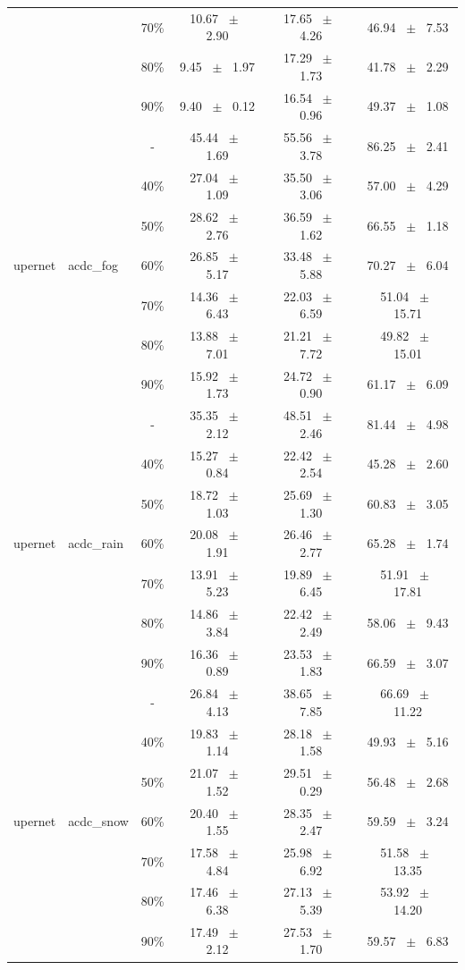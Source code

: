 \begin{table}[h]
\begin{tabular}{@{}l l c c c c@{}}
    & & 70\% & 10.67 ~$\pm$~ 2.90 & 17.65 ~$\pm$~ 4.26 & 46.94 ~$\pm$~ 7.53 \\
    & & 80\% & 9.45 ~$\pm$~ 1.97 & 17.29 ~$\pm$~ 1.73 & 41.78 ~$\pm$~ 2.29 \\
    & & 90\% & 9.40 ~$\pm$~ 0.12 & 16.54 ~$\pm$~ 0.96 & 49.37 ~$\pm$~ 1.08 \\
    \midrule
    \multirow{7}{*}{upernet} & \multirow{7}{*}{acdc_fog} & - & 45.44 ~$\pm$~ 1.69 & 55.56 ~$\pm$~ 3.78 & 86.25 ~$\pm$~ 2.41 \\
    & & 40\% & 27.04 ~$\pm$~ 1.09 & 35.50 ~$\pm$~ 3.06 & 57.00 ~$\pm$~ 4.29 \\
    & & 50\% & 28.62 ~$\pm$~ 2.76 & 36.59 ~$\pm$~ 1.62 & 66.55 ~$\pm$~ 1.18 \\
    & & 60\% & 26.85 ~$\pm$~ 5.17 & 33.48 ~$\pm$~ 5.88 & 70.27 ~$\pm$~ 6.04 \\
    & & 70\% & 14.36 ~$\pm$~ 6.43 & 22.03 ~$\pm$~ 6.59 & 51.04 ~$\pm$~ 15.71 \\
    & & 80\% & 13.88 ~$\pm$~ 7.01 & 21.21 ~$\pm$~ 7.72 & 49.82 ~$\pm$~ 15.01 \\
    & & 90\% & 15.92 ~$\pm$~ 1.73 & 24.72 ~$\pm$~ 0.90 & 61.17 ~$\pm$~ 6.09 \\
    \midrule
    \multirow{7}{*}{upernet} & \multirow{7}{*}{acdc_rain} & - & 35.35 ~$\pm$~ 2.12 & 48.51 ~$\pm$~ 2.46 & 81.44 ~$\pm$~ 4.98 \\
    & & 40\% & 15.27 ~$\pm$~ 0.84 & 22.42 ~$\pm$~ 2.54 & 45.28 ~$\pm$~ 2.60 \\
    & & 50\% & 18.72 ~$\pm$~ 1.03 & 25.69 ~$\pm$~ 1.30 & 60.83 ~$\pm$~ 3.05 \\
    & & 60\% & 20.08 ~$\pm$~ 1.91 & 26.46 ~$\pm$~ 2.77 & 65.28 ~$\pm$~ 1.74 \\
    & & 70\% & 13.91 ~$\pm$~ 5.23 & 19.89 ~$\pm$~ 6.45 & 51.91 ~$\pm$~ 17.81 \\
    & & 80\% & 14.86 ~$\pm$~ 3.84 & 22.42 ~$\pm$~ 2.49 & 58.06 ~$\pm$~ 9.43 \\
    & & 90\% & 16.36 ~$\pm$~ 0.89 & 23.53 ~$\pm$~ 1.83 & 66.59 ~$\pm$~ 3.07 \\
    \midrule
    \multirow{7}{*}{upernet} & \multirow{7}{*}{acdc_snow} & - & 26.84 ~$\pm$~ 4.13 & 38.65 ~$\pm$~ 7.85 & 66.69 ~$\pm$~ 11.22 \\
    & & 40\% & 19.83 ~$\pm$~ 1.14 & 28.18 ~$\pm$~ 1.58 & 49.93 ~$\pm$~ 5.16 \\
    & & 50\% & 21.07 ~$\pm$~ 1.52 & 29.51 ~$\pm$~ 0.29 & 56.48 ~$\pm$~ 2.68 \\
    & & 60\% & 20.40 ~$\pm$~ 1.55 & 28.35 ~$\pm$~ 2.47 & 59.59 ~$\pm$~ 3.24 \\
    & & 70\% & 17.58 ~$\pm$~ 4.84 & 25.98 ~$\pm$~ 6.92 & 51.58 ~$\pm$~ 13.35 \\
    & & 80\% & 17.46 ~$\pm$~ 6.38 & 27.13 ~$\pm$~ 5.39 & 53.92 ~$\pm$~ 14.20 \\
    & & 90\% & 17.49 ~$\pm$~ 2.12 & 27.53 ~$\pm$~ 1.70 & 59.57 ~$\pm$~ 6.83 \\
    \bottomrule
  \end{tabular}
  \label{tab:sparsity_upernet}
\end{table}